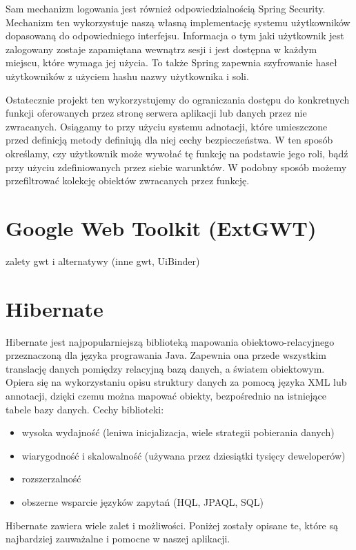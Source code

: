 \documentclass[licencjacka]{pracamgr}
\begin{document}
Sam mechanizm logowania jest również odpowiedzialnością Spring Security. Mechanizm ten wykorzystuje naszą własną implementację systemu użytkowników dopasowaną do odpowiedniego interfejsu. Informacja o tym jaki użytkownik jest zalogowany zostaje zapamiętana wewnątrz sesji i jest dostępna w każdym miejscu, które wymaga jej użycia. To także Spring zapewnia szyfrowanie haseł użytkowników z użyciem hashu nazwy użytkownika i soli.

Ostatecznie projekt ten wykorzystujemy do ograniczania dostępu do konkretnych funkcji oferowanych przez stronę serwera aplikacji lub danych przez nie zwracanych. Osiągamy to przy użyciu systemu adnotacji, które umieszczone przed definicją metody definiują dla niej cechy bezpieczeństwa. W ten sposób określamy, czy użytkownik może wywołać tę funkcję na podstawie jego roli, bądź przy użyciu zdefiniowanych przez siebie warunktów. W podobny sposób możemy przefiltrować kolekcję obiektów zwracanych przez funkcję. 

\section{Google Web Toolkit (ExtGWT)}
zalety gwt i alternatywy (inne gwt, UiBinder)

\section{Hibernate}
Hibernate jest najpopularniejszą biblioteką mapowania obiektowo-relacyjnego przeznaczoną dla języka prograwania Java.
Zapewnia ona przede wszystkim translację danych pomiędzy relacyjną bazą danych, a światem obiektowym. 
Opiera się na wykorzystaniu opisu struktury danych za pomocą języka XML lub annotacji, dzięki czemu można mapować obiekty, 
bezpośrednio na istniejące tabele bazy danych. Cechy biblioteki: 
\begin{itemize}
\item wysoka wydajność (leniwa inicjalizacja, wiele strategii pobierania danych)
\item wiarygodność i skalowalność (używana przez dziesiątki tysięcy deweloperów)
\item rozszerzalność
\item obszerne wsparcie języków zapytań (HQL, JPAQL, SQL) 
\end{itemize}
Hibernate zawiera wiele zalet i możliwości. Poniżej zostały opisane te, które 
są najbardziej zauważalne i pomocne w naszej aplikacji.
\end{document}
